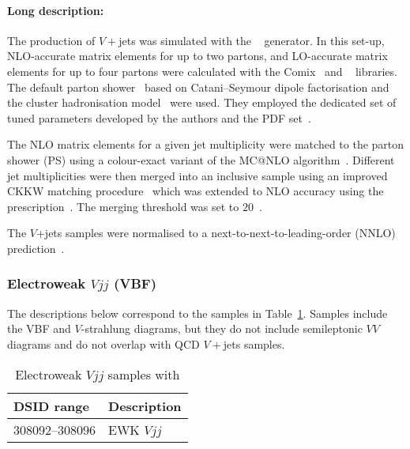 \paragraph{Long description:}

The production of $V+$jets was simulated with the \SHERPA[2.2.1]~\cite{Bothmann:2019yzt}
generator. In this set-up, NLO-accurate matrix elements for up to two partons, and LO-accurate matrix elements for up
to four partons were calculated with the Comix~\cite{Gleisberg:2008fv} and
\OPENLOOPS~\cite{Buccioni:2019sur,Cascioli:2011va,Denner:2016kdg} libraries.
The default \SHERPA parton shower~\cite{Schumann:2007mg} based on
Catani--Seymour dipole factorisation and the cluster hadronisation model~\cite{Winter:2003tt}
were used. They employed the dedicated set of tuned parameters developed by the
\SHERPA authors and the \NNPDF[3.0nnlo] PDF set~\cite{Ball:2014uwa}.

The NLO matrix elements for a given jet multiplicity were matched to the parton
shower (PS) using a colour-exact variant of the MC@NLO
algorithm~\cite{Hoeche:2011fd}. Different jet multiplicities were then merged
into an inclusive sample using an improved CKKW matching
procedure~\cite{Catani:2001cc,Hoeche:2009rj} which was extended to NLO
accuracy using the \MEPSatNLO prescription~\cite{Hoeche:2012yf}. The merging threshold 
was set to $20$~\GeV.



The $V$+jets samples were normalised to a next-to-next-to-leading-order (NNLO) 
prediction~\cite{Anastasiou:2003ds}.


\subsubsection{Electroweak $Vjj$ (VBF)}

The descriptions below correspond to the samples in
Table~\ref{tab:ewkvjets-sherpa}.  Samples include the VBF and $V$-strahlung diagrams, but 
they do not include semileptonic $VV$ diagrams and do not overlap with QCD $V+$jets samples.

\begin{table}[!htbp]
  \begin{center}
    \caption{Electroweak $Vjj$ samples with \SHERPA } \label{tab:ewkvjets-sherpa}
    \begin{tabular}{ l | l }
      \hline
      DSID range & Description \\
      \hline
      308092--308096    & EWK $Vjj$ \\
      \hline
    \end{tabular}
  \end{center}
\end{table}

